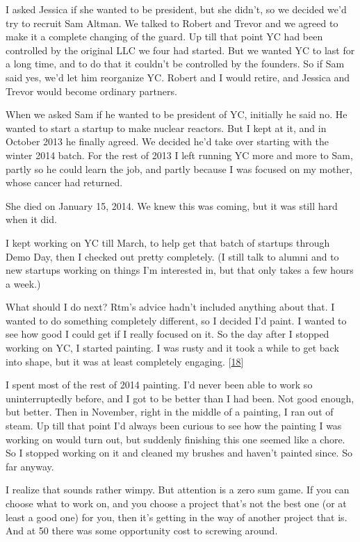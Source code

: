 I asked Jessica if she wanted to be president, but she didn't, so we
decided we'd try to recruit Sam Altman. We talked to Robert and Trevor
and we agreed to make it a complete changing of the guard. Up till that
point YC had been controlled by the original LLC we four had started.
But we wanted YC to last for a long time, and to do that it couldn't be
controlled by the founders. So if Sam said yes, we'd let him reorganize
YC. Robert and I would retire, and Jessica and Trevor would become
ordinary partners.

When we asked Sam if he wanted to be president of YC, initially he said
no. He wanted to start a startup to make nuclear reactors. But I kept at
it, and in October 2013 he finally agreed. We decided he'd take over
starting with the winter 2014 batch. For the rest of 2013 I left running
YC more and more to Sam, partly so he could learn the job, and partly
because I was focused on my mother, whose cancer had returned.

She died on January 15, 2014. We knew this was coming, but it was still
hard when it did.

I kept working on YC till March, to help get that batch of startups
through Demo Day, then I checked out pretty completely. (I still talk to
alumni and to new startups working on things I'm interested in, but that
only takes a few hours a week.)

What should I do next? Rtm's advice hadn't included anything about that.
I wanted to do something completely different, so I decided I'd paint. I
wanted to see how good I could get if I really focused on it. So the day
after I stopped working on YC, I started painting. I was rusty and it
took a while to get back into shape, but it was at least completely
engaging. {[}\hyperref[f18n]{18}{]}

I spent most of the rest of 2014 painting. I'd never been able to work
so uninterruptedly before, and I got to be better than I had been. Not
good enough, but better. Then in November, right in the middle of a
painting, I ran out of steam. Up till that point I'd always been curious
to see how the painting I was working on would turn out, but suddenly
finishing this one seemed like a chore. So I stopped working on it and
cleaned my brushes and haven't painted since. So far anyway.

I realize that sounds rather wimpy. But attention is a zero sum game. If
you can choose what to work on, and you choose a project that's not the
best one (or at least a good one) for you, then it's getting in the way
of another project that is. And at 50 there was some opportunity cost to
screwing around.

